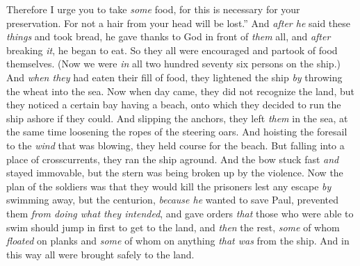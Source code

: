 \begin{biblechapter}
\verse Therefore I urge you to take \textit{some} food, for this is necessary for your preservation. For not a hair from your head will be lost.”
\verse And \textit{after he} said these \textit{things} and took bread, he gave thanks to God in front of \textit{them} all, and \textit{after} breaking \textit{it}, he began to eat.
\verse So they all were encouraged and partook of food themselves.
\verse (Now we were \textit{in} all two hundred seventy six persons on the ship.)
\verse And \textit{when they} had eaten their fill of food, they lightened the ship \textit{by} throwing the wheat into the sea.
 Now when day came, they did not recognize the land, but they noticed a certain bay having a beach, onto which they decided to run the ship ashore if they could.
\verse And slipping the anchors, they left \textit{them} in the sea, at the same time loosening the ropes of the steering oars. And hoisting the foresail to the \textit{wind} that was blowing, they held course for the beach.
\verse But falling into a place of crosscurrents, they ran the ship aground. And the bow stuck fast \textit{and} stayed immovable, but the stern was being broken up by the violence.
\verse Now the plan of the soldiers was that they would kill the prisoners lest any escape \textit{by} swimming away,
\verse but the centurion, \textit{because he} wanted to save Paul, prevented them \textit{from doing what they intended}, and gave orders \textit{that} those who were able to swim should jump in first to get to the land,
\verse and \textit{then} the rest, \textit{some} of whom \textit{floated} on planks and \textit{some} of whom on anything \textit{that was} from the ship. And in this way all were brought safely to the land.
\end{biblechapter}

